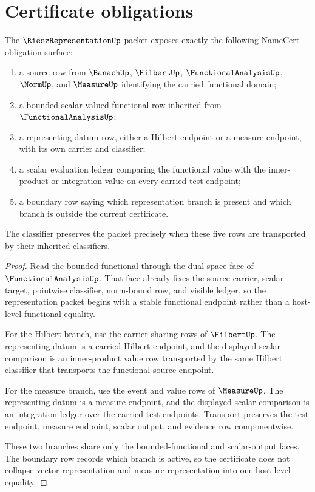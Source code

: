 \section{Certificate obligations}
\label{sec:rieszrepresentation-obligations}

\begin{theorem}
\label{thm:rieszrepresentation-namecert-obligation-surface}
The $\RieszRepresentationUp$ packet exposes exactly the following NameCert obligation surface:
\begin{enumerate}
  \item a source row from $\BanachUp$, $\HilbertUp$, $\FunctionalAnalysisUp$, $\NormUp$, and $\MeasureUp$ identifying the carried functional domain;
  \item a bounded scalar-valued functional row inherited from $\FunctionalAnalysisUp$;
  \item a representing datum row, either a Hilbert endpoint or a measure endpoint, with its own carrier and classifier;
  \item a scalar evaluation ledger comparing the functional value with the inner-product or integration value on every carried test endpoint;
  \item a boundary row saying which representation branch is present and which branch is outside the current certificate.
\end{enumerate}
The classifier preserves the packet precisely when these five rows are transported by their inherited classifiers.
\end{theorem}
\begin{proof}
Read the bounded functional through the dual-space face of $\FunctionalAnalysisUp$. That face already fixes the source carrier, scalar target, pointwise classifier, norm-bound row, and visible ledger, so the representation packet begins with a stable functional endpoint rather than a host-level functional equality.

For the Hilbert branch, use the carrier-sharing rows of $\HilbertUp$. The representing datum is a carried Hilbert endpoint, and the displayed scalar comparison is an inner-product value row transported by the same Hilbert classifier that transports the functional source endpoint.

For the measure branch, use the event and value rows of $\MeasureUp$. The representing datum is a measure endpoint, and the displayed scalar comparison is an integration ledger over the carried test endpoints. Transport preserves the test endpoint, measure endpoint, scalar output, and evidence row componentwise.

These two branches share only the bounded-functional and scalar-output faces. The boundary row records which branch is active, so the certificate does not collapse vector representation and measure representation into one host-level equality.
\end{proof}

